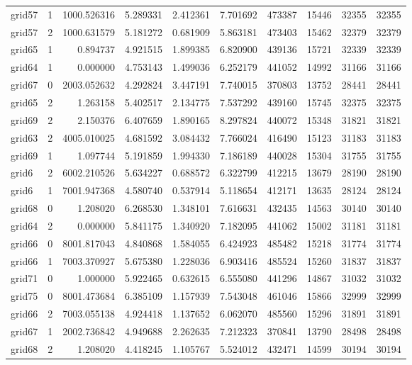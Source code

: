 \begin{longtable}{|l|r|r|r|r|r|r|r|r|r|}
grid57 & 1 & 1000.526316 & 5.289331 & 2.412361 & 7.701692 & 473387 & 15446 & 32355 & 32355 \\
grid57 & 2 & 1000.631579 & 5.181272 & 0.681909 & 5.863181 & 473403 & 15462 & 32379 & 32379 \\
grid65 & 1 & 0.894737 & 4.921515 & 1.899385 & 6.820900 & 439136 & 15721 & 32339 & 32339 \\
grid64 & 1 & 0.000000 & 4.753143 & 1.499036 & 6.252179 & 441052 & 14992 & 31166 & 31166 \\
grid67 & 0 & 2003.052632 & 4.292824 & 3.447191 & 7.740015 & 370803 & 13752 & 28441 & 28441 \\
grid65 & 2 & 1.263158 & 5.402517 & 2.134775 & 7.537292 & 439160 & 15745 & 32375 & 32375 \\
grid69 & 2 & 2.150376 & 6.407659 & 1.890165 & 8.297824 & 440072 & 15348 & 31821 & 31821 \\
grid63 & 2 & 4005.010025 & 4.681592 & 3.084432 & 7.766024 & 416490 & 15123 & 31183 & 31183 \\
grid69 & 1 & 1.097744 & 5.191859 & 1.994330 & 7.186189 & 440028 & 15304 & 31755 & 31755 \\
grid6 & 2 & 6002.210526 & 5.634227 & 0.688572 & 6.322799 & 412215 & 13679 & 28190 & 28190 \\
grid6 & 1 & 7001.947368 & 4.580740 & 0.537914 & 5.118654 & 412171 & 13635 & 28124 & 28124 \\
grid68 & 0 & 1.208020 & 6.268530 & 1.348101 & 7.616631 & 432435 & 14563 & 30140 & 30140 \\
grid64 & 2 & 0.000000 & 5.841175 & 1.340920 & 7.182095 & 441062 & 15002 & 31181 & 31181 \\
grid66 & 0 & 8001.817043 & 4.840868 & 1.584055 & 6.424923 & 485482 & 15218 & 31774 & 31774 \\
grid66 & 1 & 7003.370927 & 5.675380 & 1.228036 & 6.903416 & 485524 & 15260 & 31837 & 31837 \\
grid71 & 0 & 1.000000 & 5.922465 & 0.632615 & 6.555080 & 441296 & 14867 & 31032 & 31032 \\
grid75 & 0 & 8001.473684 & 6.385109 & 1.157939 & 7.543048 & 461046 & 15866 & 32999 & 32999 \\
grid66 & 2 & 7003.055138 & 4.924418 & 1.137652 & 6.062070 & 485560 & 15296 & 31891 & 31891 \\
grid67 & 1 & 2002.736842 & 4.949688 & 2.262635 & 7.212323 & 370841 & 13790 & 28498 & 28498 \\
grid68 & 2 & 1.208020 & 4.418245 & 1.105767 & 5.524012 & 432471 & 14599 & 30194 & 30194 \\

\end{longtable}
